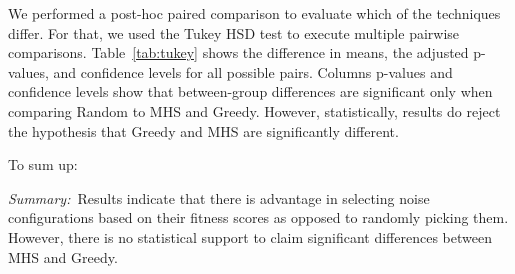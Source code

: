 \documentclass[conference]{IEEEtran}
\begin{document}
\begin{table}[ht]
\caption{Post-hoc analysis for RQ3 --- Multiple Comparison of Means using Tukey HSD} %
\centering %

\label{tab:tukey} %
\end{table}

We performed a post-hoc paired comparison to evaluate which of the techniques differ. For that, we used the Tukey HSD test to execute multiple pairwise comparisons.
Table~\ref{tab:tukey} shows the difference in means, the adjusted p-values, and confidence levels for all possible pairs. Columns p-values and confidence levels show that between-group differences are significant only when comparing Random to MHS and Greedy. However, statistically, results do reject the hypothesis that Greedy and MHS are significantly different.




To sum up: 
\begin{center}
\begin{tcolorbox}[enhanced,width=3.4in,center upper,drop shadow southwest,sharp corners]
\emph{Summary:}~Results indicate that there is advantage in selecting noise configurations based on their fitness scores as opposed to randomly picking them. However, there is no statistical support to claim significant differences between MHS and Greedy.
\end{tcolorbox}
\end{center}
\end{document}
